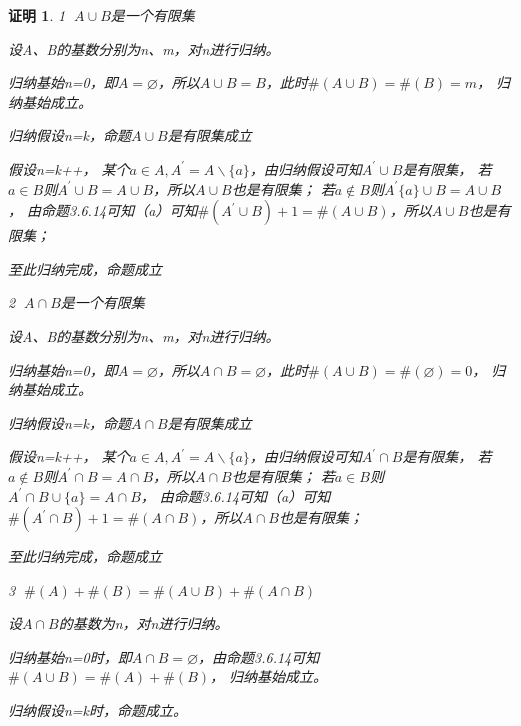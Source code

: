 \documentclass{article}
\theoremstyle{mystyle}
\theoremstyle{zproofstyle}
\newtheorem*{zproof}{证明}
\begin{document}
\begin{zproof}
  \textcircled{1} $A \cup B$是一个有限集

  设A、B的基数分别为n、m，对n进行归纳。

  归纳基始n=0，即$A = \varnothing$，所以$A \cup B = B$，此时$\#(A \cup B) = \#(B) = m$，
  归纳基始成立。

  归纳假设n=k，命题$A \cup B$是有限集成立

  假设n=k++，
  某个$a \in A, A^\prime = A \backslash \{a\}$，由归纳假设可知$A^\prime \cup B$是有限集，
  若$a \in B$则$A^\prime \cup B = A \cup B$，所以$A \cup B$也是有限集；
  若$a \notin B$则$A^\prime \{a\} \cup B = A \cup B$，
  由命题3.6.14可知（a）可知$\#(A^\prime \cup B)+1=\#(A \cup B)$，所以$A \cup B$也是有限集；

  至此归纳完成，命题成立

  \textcircled{2} $A \cap B$是一个有限集

  设A、B的基数分别为n、m，对n进行归纳。

  归纳基始n=0，即$A = \varnothing$，所以$A \cap B = \varnothing$，此时$\#(A \cup B) = \#(\varnothing) = 0$，
  归纳基始成立。

  归纳假设n=k，命题$A \cap B$是有限集成立

  假设n=k++，
  某个$a \in A, A^\prime = A \backslash \{a\}$，由归纳假设可知$A^\prime \cap B$是有限集，
  若$a \notin B$则$A^\prime \cap B = A \cap B$，所以$A \cap B$也是有限集；
  若$a \in B$则$A^\prime \cap B \cup \{a\} = A \cap B$，
  由命题3.6.14可知（a）可知$\#(A^\prime \cap B)+1=\#(A \cap B)$，所以$A \cap B$也是有限集；

  至此归纳完成，命题成立

  \textcircled{3} $\#(A) + \#(B) = \#(A \cup B) + \#(A \cap B)$

  设$A \cap B$的基数为n，对n进行归纳。

  归纳基始n=0时，即$A \cap B = \varnothing$，由命题3.6.14可知$\#(A \cup B) = \#(A) + \#(B)$，
  归纳基始成立。

  归纳假设n=k时，命题成立。


\end{zproof}
\end{document}
